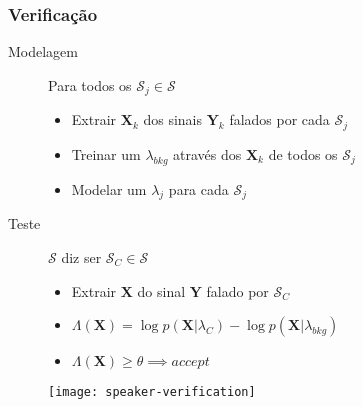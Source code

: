 \begin{frame}
\frametitle{Verificação}
\begin{description}
    \item[Modelagem] Para todos os $\mathcal{S}_j \in \boldsymbol{\mathcal{S}}$
    \pause
    \begin{itemize}
        \item Extrair $\boldsymbol{X}_k$ dos sinais $\boldsymbol{Y}_k$ falados por cada $\mathcal{S}_j$
        \pause
        \item Treinar um $\lambda_{bkg}$ através dos $\boldsymbol{X}_k$ de todos os $\mathcal{S}_j$
        \pause
        \item Modelar um $\lambda_j$ para cada $\mathcal{S}_j$
        \pause
    \end{itemize}
    \item[Teste] $\mathcal{S}$ diz ser $\mathcal{S}_C \in \boldsymbol{\mathcal{S}}$
    \pause
    \begin{itemize}
        \item Extrair $\boldsymbol{X}$ do sinal $\boldsymbol{Y}$ falado por $\mathcal{S}_C$
        \pause
        \item $\Lambda(\boldsymbol{X}) = \log p(\boldsymbol{X}|\lambda_{C}) - \log p(\boldsymbol{X}|\lambda_{bkg})$
        \pause
        \item $\Lambda(\boldsymbol{X}) \geq \theta \implies accept$
        \pause
    \end{itemize}
\end{description}

\begin{figure}[ht]
    \centering
    \texttt{[image: speaker-verification]}
\end{figure}
\end{frame}